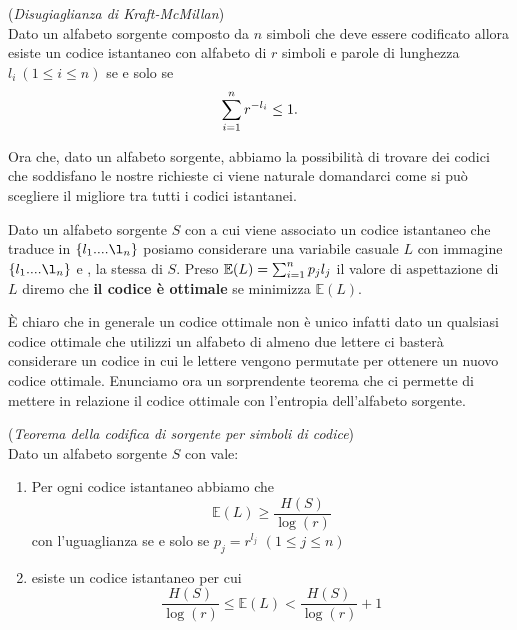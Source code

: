 \begin{teo} \label{teo:disugKM} (\textit{Disugiaglianza di Kraft-McMillan})\\
Dato un alfabeto sorgente composto da $n$ simboli che deve essere codificato allora esiste un codice istantaneo con alfabeto di $r$ simboli e parole di lunghezza $l_i \ (1 \leq i \leq n)$ se e solo se 
\begin{equation}
\sum_{i=1}^n r^{-l_i}\leq 1.
\end{equation} 
\end{teo}

Ora che, dato un alfabeto sorgente, abbiamo la possibilità di trovare dei codici che soddisfano le nostre richieste ci viene naturale domandarci come si può scegliere il migliore tra tutti i codici istantanei.

\begin{defi}
Dato un alfabeto sorgente $S$ \va con \lep a cui viene associato un codice istantaneo che traduce \va in $\{ l_1....\l_n \}$ posiamo considerare una variabile casuale $L$ con immagine $\{ l_1....\l_n \}$ e \lep , la stessa di $S$. Preso $\mathbb{E}(L)=\sum_{i=1}^n p_j l_j$ il valore di aspettazione di $L$ diremo che \textbf{il codice è ottimale} se minimizza $\mathbb{E}(L)$.
\end{defi}
È chiaro che in generale un codice ottimale non è unico infatti dato un qualsiasi codice ottimale che utilizzi un alfabeto di almeno due lettere ci basterà considerare un codice in cui le lettere vengono permutate per ottenere un nuovo codice ottimale.
Enunciamo ora un sorprendente teorema che ci permette di mettere in relazione il codice ottimale con l'entropia dell'alfabeto sorgente.
 
\begin{teo}(\textit{Teorema della codifica di sorgente per simboli di codice})\\
Dato un alfabeto sorgente $S$ con \lep vale:
\begin{enumerate}
\item Per ogni codice istantaneo abbiamo che
\begin{equation}
\mathbb{E}(L)\geq \frac{H(S)}{\log (r)}
\end{equation}
con l'uguaglianza se e solo se $p_j=r^{l_j}$ $(1 \leq j \leq n)$
\item esiste un codice istantaneo per cui
\begin{equation}
\frac{H(S)}{\log (r)} \leq \mathbb{E}(L) < \frac{H(S)}{\log (r)} +1
\end{equation}
\end{enumerate}
\end{teo}

